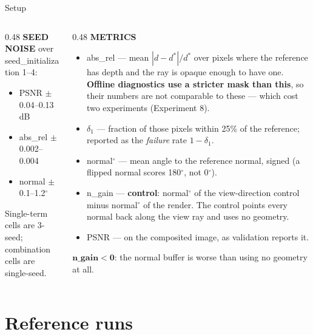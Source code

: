 \documentclass[aspectratio=169,9pt]{beamer}
\makeatletter
\newcommand{\dn}[1]{\textcolor{bad}{#1}}
\newcommand{\code}[1]{{\ttfamily\fontsize{0.92\f@size}{\f@baselineskip}\selectfont #1}}
\newcommand{\lbl}[1]{\textcolor{lblcol}{\scriptsize\bfseries #1}\hspace{0.5em}}
\makeatother
\begin{document}
\begin{frame}{Setup}
\begin{columns}[T]
\begin{column}{0.48\textwidth}
      \lbl{SEED NOISE} over \code{seed\_initialization} 1--4:
      \begin{itemize}
        \item PSNR $\pm$0.04--0.13\,dB
        \item \code{abs\_rel} $\pm$0.002--0.004
        \item normal $\pm$0.1--1.2$^\circ$
      \end{itemize}
      Single-term cells are 3-seed; combination cells are single-seed.
    \end{column}
    \begin{column}{0.48\textwidth}\small
      \lbl{METRICS}
      \begin{itemize}
        \item \code{abs\_rel} --- mean $|d - d^{*}|/d^{*}$ over pixels where the reference has
              depth and the ray is opaque enough to have one. \textbf{Offline diagnostics use a
              stricter mask than this}, so their numbers are not comparable to these --- which
              cost two experiments (Experiment 8).
        \item $\delta_1$ --- fraction of those pixels within 25\% of the reference; reported as
              the \emph{failure} rate $1-\delta_1$.
        \item normal$^\circ$ --- mean angle to the reference normal, signed (a flipped normal
              scores 180$^\circ$, not 0$^\circ$).
        \item \code{n\_gain} --- \textbf{control}: normal$^\circ$ of the view-direction control
              minus normal$^\circ$ of the render. The control points every normal back along the
              view ray and uses no geometry.
        \item PSNR --- on the composited image, as validation reports it.
      \end{itemize}
      \vspace{0.3em}
      {\footnotesize\dn{$\mathbf{n\_gain < 0}$}: the normal buffer is worse than using no
      geometry at all.}
    \end{column}
  \end{columns}
\end{frame}

\section{Reference runs}
\end{document}
